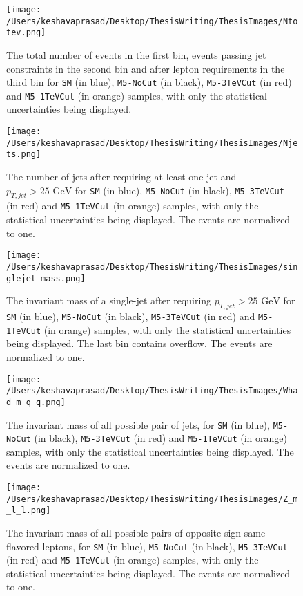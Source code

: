 \begin{figure}[!htb]
	\centering
	\texttt{[image: /Users/keshavaprasad/Desktop/ThesisWriting/ThesisImages/Ntotev.png]}
	\caption{The total number of events in the first bin, events passing jet constraints in the second bin and after lepton requirements in the third bin for \texttt{SM} (in blue), \texttt{M5-NoCut} (in black), \texttt{M5-3TeVCut} (in red) and \texttt{M5-1TeVCut} (in orange) samples, with only the statistical uncertainties being displayed.}
	\label{Cut flow Histogram-PostCuts}
\end{figure}

\begin{figure}[!htb]%
	\centering
	\texttt{[image: /Users/keshavaprasad/Desktop/ThesisWriting/ThesisImages/Njets.png]}
	\caption{The number of jets after requiring at least one jet and $p_{T,jet}>25 \text{ GeV}$  for \texttt{SM} (in blue), \texttt{M5-NoCut} (in black), \texttt{M5-3TeVCut} (in red) and \texttt{M5-1TeVCut} (in orange) samples, with only the statistical uncertainties being displayed. The events are normalized to one.}
	\label{NJets-PostCuts}
\end{figure}

\begin{figure}[!htb]
	\centering
	\texttt{[image: /Users/keshavaprasad/Desktop/ThesisWriting/ThesisImages/singlejet\_mass.png]}
	\caption{The invariant mass of a single-jet after requiring $p_{T,jet}>25 \text{ GeV}$ for \texttt{SM} (in blue), \texttt{M5-NoCut} (in black), \texttt{M5-3TeVCut} (in red) and \texttt{M5-1TeVCut} (in orange) samples, with only the statistical uncertainties being displayed. The last bin contains overflow. The events are normalized to one.}
	\label{Single Jet Mass -Post Cuts}
\end{figure}

\begin{figure}[!htb]%
	\centering
	\texttt{[image: /Users/keshavaprasad/Desktop/ThesisWriting/ThesisImages/Whad\_m\_q\_q.png]}
	\caption{The invariant mass of all possible pair of jets, for \texttt{SM} (in blue), \texttt{M5-NoCut} (in black), \texttt{M5-3TeVCut} (in red) and \texttt{M5-1TeVCut} (in orange) samples, with only the statistical uncertainties being displayed. The events are normalized to one.}
	\label{Had Candidate}
\end{figure}


\begin{figure}[!htb]%
	\centering
	\texttt{[image: /Users/keshavaprasad/Desktop/ThesisWriting/ThesisImages/Z\_m\_l\_l.png]}
	\caption{The invariant mass of all possible pairs of opposite-sign-same-flavored leptons, for \texttt{SM} (in blue), \texttt{M5-NoCut} (in black), \texttt{M5-3TeVCut} (in red) and \texttt{M5-1TeVCut} (in orange) samples, with only the statistical uncertainties being displayed. The events are normalized to one.}
	\label{Z Candidate}
\end{figure}

